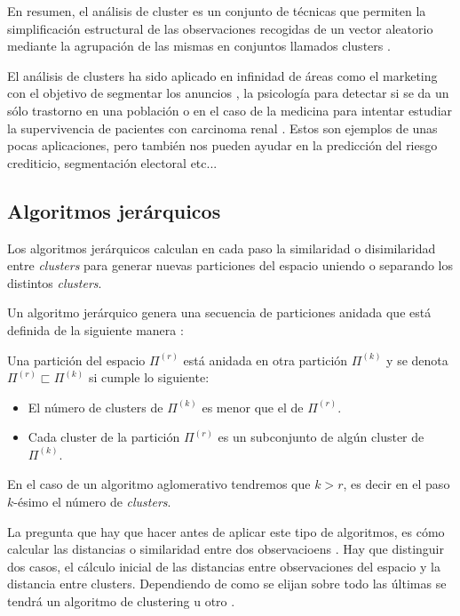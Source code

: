 \noindent En resumen, el análisis de cluster es un conjunto de técnicas que permiten la simplificación estructural de las observaciones recogidas de un vector aleatorio mediante la agrupación de las mismas en conjuntos llamados clusters \cite{Everitt 2011}. 

\noindent El análisis de clusters ha sido aplicado en infinidad de áreas como el marketing con el objetivo de segmentar los anuncios \cite{Okazaki 2006}, la psicología para detectar si se da un sólo trastorno en una población \cite{Everitt 2002} o en el caso de la medicina para intentar estudiar la supervivencia de pacientes con carcinoma renal \cite{Witten 2010}. Estos son ejemplos de unas pocas aplicaciones, pero también nos pueden ayudar en la predicción del riesgo crediticio, segmentación electoral etc... 

\subsection{Algoritmos jerárquicos}

\noindent Los algoritmos jerárquicos calculan en cada paso la similaridad o disimilaridad entre \emph{clusters} para generar nuevas particiones del espacio uniendo o separando los distintos \emph{clusters}.

\noindent Un algoritmo jerárquico genera una secuencia de particiones anidada que está definida de la siguiente manera \cite{Scitovski 2021} :
\begin{defi}
Una partición del espacio $\Pi^{(r)}$ está anidada en otra partición $\Pi^{(k)}$ y se denota $\Pi^{(r)} \sqsubset \Pi^{(k)}$ si cumple lo siguiente:
\begin{itemize}
\item El número de clusters de $\Pi^{(k)}$ es menor que el de $\Pi^{(r)}$. 
\item Cada cluster de la partición $\Pi^{(r)}$ es un subconjunto de algún cluster de $\Pi^{(k)}$. 
\end{itemize}
En el caso de un algoritmo aglomerativo tendremos que $k>r$, es decir en el paso $k$-ésimo el número de \emph{clusters}.

\end{defi}

\noindent La pregunta que hay que hacer antes de aplicar este tipo de algoritmos, es cómo calcular las distancias o similaridad entre dos observacioens . Hay que distinguir dos casos, el cálculo inicial de las distancias entre observaciones del espacio y la distancia entre clusters. Dependiendo de como se elijan sobre todo las últimas se tendrá un algoritmo de clustering u otro \cite{Peña 2002}. 

